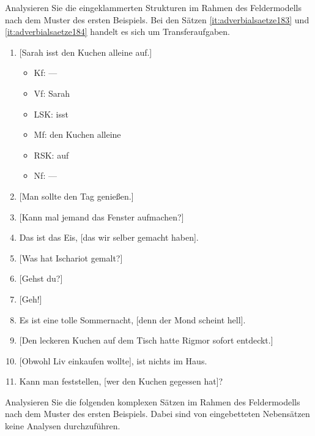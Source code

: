 \Uebungen

 \label{exc:saetze01} Analysieren Sie die eingeklammerten Strukturen im Rahmen des Feldermodells nach dem Muster des ersten Beispiels.
Bei den Sätzen \ref{it:adverbialsaetze183} und \ref{it:adverbialsaetze184} handelt es sich um Transferaufgaben.

\begin{enumerate}
  \item{[Sarah isst den Kuchen alleine auf.]}
    \begin{itemize}
      \item Kf: ---
      \item Vf: Sarah
      \item LSK: isst
      \item Mf: den Kuchen alleine
      \item RSK: auf
      \item Nf: ---
    \end{itemize}
  \item{[Man sollte den Tag genießen.]}
  \item{[Kann mal jemand das Fenster aufmachen?]}
  \item\label{it:adverbialsaetze182} Das ist das Eis, [das wir selber gemacht haben].
  \item{[Was hat Ischariot gemalt?]}
  \item{[Gehst du?]}
  \item{\label{it:adverbialsaetze183} [Geh!]}
  \item\label{it:adverbialsaetze184} Es ist eine tolle Sommernacht, [denn der Mond scheint hell].
  \item{[Den leckeren Kuchen auf dem Tisch hatte Rigmor sofort entdeckt.]}
  \item{[Obwohl Liv einkaufen wollte], ist nichts im Haus.}
  \item Kann man feststellen, [wer den Kuchen gegessen hat]?
\end{enumerate}

 \label{exc:saetze02} Analysieren Sie die folgenden komplexen Sätzen im Rahmen des Feldermodells nach dem Muster des ersten Beispiels.
Dabei sind von eingebetteten Nebensätzen keine Analysen durchzuführen.

